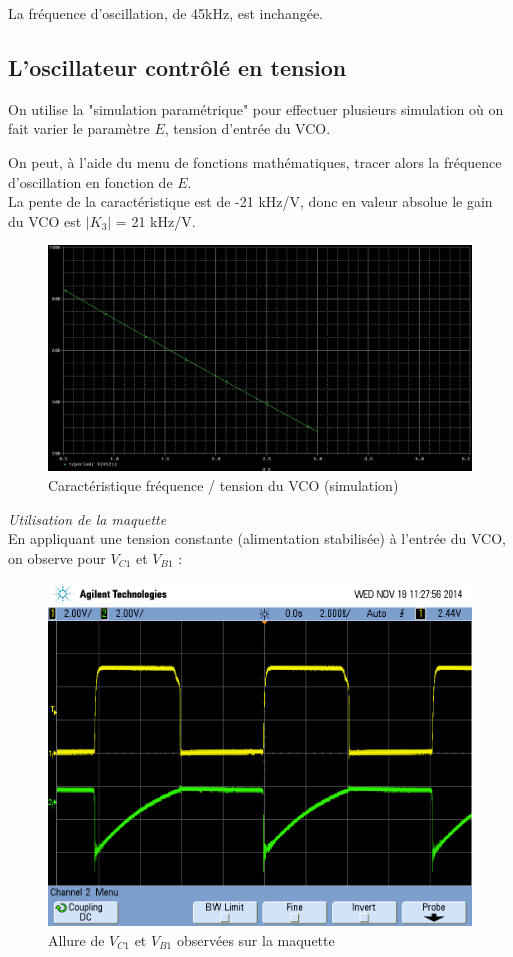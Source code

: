 \documentclass[../../Cours_M1.tex]{subfiles}
\begin{document}
La fréquence d'oscillation, de 45kHz, est inchangée.

\subsection{L'oscillateur contrôlé en tension}

On utilise la "simulation paramétrique" pour effectuer plusieurs simulation où on fait varier le paramètre $E$, tension d'entrée du VCO.

On peut, à l'aide du menu de fonctions mathématiques, tracer alors la fréquence d'oscillation en fonction de $E$.\\

La pente de la caractéristique est de -21 kHz/V, donc en valeur absolue le gain du VCO est $|K_3|$ = 21 kHz/V.
\begin{figure}[h!]
\centering
\includegraphics[scale=0.3]{AATC/I3f(E).PNG}
\caption{Caractéristique  fréquence / tension du VCO (simulation)}
\end{figure}

\newpage
\textit{Utilisation de la maquette}\\

En appliquant une tension constante (alimentation stabilisée) à l'entrée du VCO, on observe pour $V_{C1}$ et $V_{B1}$ :
\begin{figure}[h!]
\centering
\includegraphics[scale=0.3]{AATC/I3maq.PNG}
\caption{Allure de $V_{C1}$ et $V_{B1}$ observées sur la maquette}
\end{figure}
\end{document}
